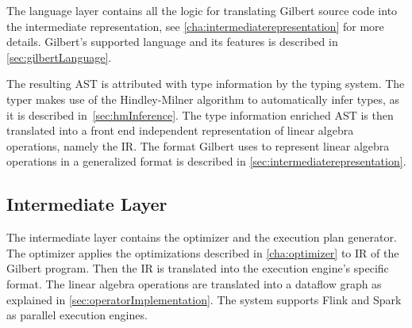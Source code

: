 The language layer contains all the logic for translating Gilbert source code into the intermediate representation, see \cref{cha:intermediaterepresentation} for more details.
Gilbert's supported language and its features is described in \cref{sec:gilbertLanguage}.

The resulting AST is attributed with type information by the typing system.
The typer makes use of the Hindley-Milner algorithm to automatically infer types, as it is described in~\cref{sec:hmInference}.
The type information enriched AST is then translated into a front end independent representation of linear algebra operations, namely the IR.
The format Gilbert uses to represent linear algebra operations in a generalized format is described in \cref{sec:intermediaterepresentation}.

\subsection{Intermediate Layer}

The intermediate layer contains the optimizer and the execution plan generator.
The optimizer applies the optimizations described in \cref{cha:optimizer} to IR of the Gilbert program.
Then the IR is translated into the execution engine's specific format.
The linear algebra operations are translated into a dataflow graph as explained in \cref{sec:operatorImplementation}.
The system supports Flink and Spark as parallel execution engines.